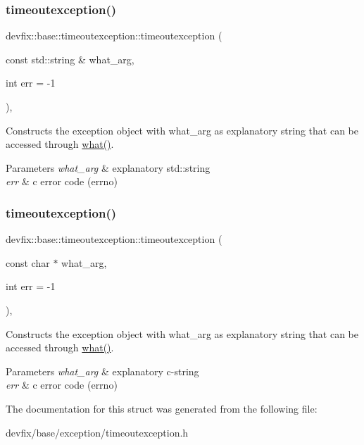 \subsubsection{\texorpdfstring{timeoutexception()}{timeoutexception()}\hspace{0.1cm}{\footnotesize\ttfamily [1/2]}}
{\footnotesize\ttfamily devfix\+::base\+::timeoutexception\+::timeoutexception (\begin{DoxyParamCaption}\item[{const std\+::string \&}]{what\+\_\+arg,  }\item[{int}]{err = {\ttfamily -\/1} }\end{DoxyParamCaption})\hspace{0.3cm}{\ttfamily [inline]}, {\ttfamily [explicit]}}

Constructs the exception object with what\+\_\+arg as explanatory string that can be accessed through \hyperlink{structdevfix_1_1base_1_1baseexception_a10cc739c08d7d38b89abea342824396f}{what()}. 
\begin{DoxyParams}{Parameters}
{\em what\+\_\+arg} & explanatory std\+::string \\
\hline
{\em err} & c error code (errno) \\
\hline
\end{DoxyParams}
\mbox{\label{structdevfix_1_1base_1_1timeoutexception_a684cb2e6e0d78b98d30c505a6bf9066d}} 
\subsubsection{\texorpdfstring{timeoutexception()}{timeoutexception()}\hspace{0.1cm}{\footnotesize\ttfamily [2/2]}}
{\footnotesize\ttfamily devfix\+::base\+::timeoutexception\+::timeoutexception (\begin{DoxyParamCaption}\item[{const char $\ast$}]{what\+\_\+arg,  }\item[{int}]{err = {\ttfamily -\/1} }\end{DoxyParamCaption})\hspace{0.3cm}{\ttfamily [inline]}, {\ttfamily [explicit]}}

Constructs the exception object with what\+\_\+arg as explanatory string that can be accessed through \hyperlink{structdevfix_1_1base_1_1baseexception_a10cc739c08d7d38b89abea342824396f}{what()}. 
\begin{DoxyParams}{Parameters}
{\em what\+\_\+arg} & explanatory c-\/string \\
\hline
{\em err} & c error code (errno) \\
\hline
\end{DoxyParams}


The documentation for this struct was generated from the following file\+:\begin{DoxyCompactItemize}
\item 
devfix/base/exception/timeoutexception.\+h\end{DoxyCompactItemize}
